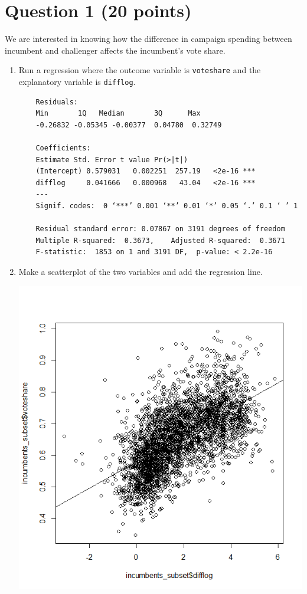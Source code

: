 \documentclass[12pt,letterpaper]{article}
\begin{document}
\section*{Question 1 (20 points)}
\vspace{.25cm}
\noindent We are interested in knowing how the difference in campaign spending between incumbent and challenger affects the incumbent's vote share. 
	\begin{enumerate}
		\item Run a regression where the outcome variable is \texttt{voteshare} and the explanatory variable is \texttt{difflog}.	
		  
			\begin{verbatim}
	Residuals:
	Min       1Q   Median       3Q      Max 
	-0.26832 -0.05345 -0.00377  0.04780  0.32749 
	
	Coefficients:
	Estimate Std. Error t value Pr(>|t|)    
	(Intercept) 0.579031   0.002251  257.19   <2e-16 ***
	difflog     0.041666   0.000968   43.04   <2e-16 ***
	---
	Signif. codes:  0 ‘***’ 0.001 ‘**’ 0.01 ‘*’ 0.05 ‘.’ 0.1 ‘ ’ 1
	
	Residual standard error: 0.07867 on 3191 degrees of freedom
	Multiple R-squared:  0.3673,	Adjusted R-squared:  0.3671 
	F-statistic:  1853 on 1 and 3191 DF,  p-value: < 2.2e-16
		\end{verbatim}
		\vspace{1cm}
		
		\item Make a scatterplot of the two variables and add the regression line. 
		 
		\includegraphics{Q1P1.png}		
			\vspace{3cm}
		

\end{enumerate}
\end{document}
